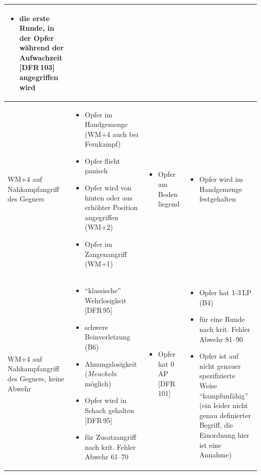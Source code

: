 \documentclass[10pt,a4paper,germanpar]{article}
\begin{document}
\begin{table}[htbp]
{\begin{center}
\begin{tabu}{|p{2.4cm}||p{4.3cm}|p{4.1cm}|p{4.5cm}|}
\begin{itemize}
      \item die erste Runde, in der Opfer während der Aufwachzeit
        [DFR\,103] angegriffen wird
      \end{itemize} \\
      \hline
      WM+4 auf Nahkampfangriff des Gegners &
      \begin{itemize}
      \item Opfer im Handgemenge (WM+4 auch bei Fernkampf)
      \item Opfer flieht panisch
      \item Opfer wird von hinten oder aus erhöhter Position
        angegriffen (WM+2)
      \item Opfer im Zangenangriff (WM+1)
      \end{itemize} &
      \begin{itemize}
      \item Opfer am Boden liegend
      \end{itemize} &
      \begin{itemize}
      \item Opfer wird im Handgemenge festgehalten
      \end{itemize}
      \\
      \hline
      WM+4 auf Nahkampfangriff des Gegners, keine Abwehr &
      \begin{itemize}
      \item "`klassische"' Wehrlosigkeit [DFR\,95]
      \item schwere Beinverletzung (B6)
      \item Ahnungslosigkeit (\emph{Meucheln} möglich)
      \item Opfer wird in Schach gehalten [DFR\,95]
      \item für Zusatzangriff nach krit. Fehler Abwehr 61--70
      \end{itemize}&
      \begin{itemize}
      \item Opfer hat 0\,AP [DFR\,101]
      \end{itemize}& 
      \begin{itemize}
      \item Opfer hat 1-3\,LP (B4)
      \item für eine Runde nach krit. Fehler Abwehr 81--90
      \item Opfer ist auf nicht genauer spezifizierte Weise
        "`kampfunfähig"' (ein leider nicht genau definierter Begriff,
        die Einordnung hier ist eine Annahme)
      \end{itemize}\\

\end{tabu}
\end{center}}
\end{table}
\end{document}
